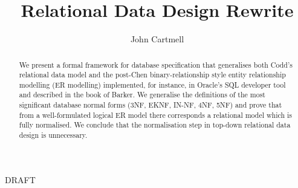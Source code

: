 \documentclass[10pt,a4paper]{article}
\begin{document}
\title{Relational Data Design Rewrite}


\author{John Cartmell}

\maketitle
\begin{center}
DRAFT
\end{center}

\begin{abstract}
\noindent 
We present a formal framework for database specification that generalises  both Codd's relational data model and the post-Chen binary-relationship style entity relationship modelling (ER modelling) implemented, for instance, in Oracle's SQL developer tool and  described in the book of Barker.  We generalise the definitions of the most significant database normal forms (3NF, EKNF, IN-NF, 4NF, 5NF) and prove that from a well-formulated logical ER model there corresponds a relational model which is fully normalised. We conclude that the normalisation step in top-down relational data design is unnecessary.  
\end{abstract}

% 





 

	 
\end{document}
